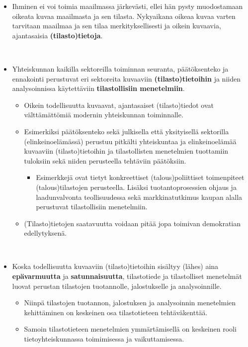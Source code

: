 \documentclass[
]{book}
\providecommand{\tightlist}{%
  \setlength{\itemsep}{0pt}\setlength{\parskip}{0pt}}
\begin{document}
\begin{itemize}
\tightlist
\item
  Ihminen ei voi toimia maailmassa järkevästi, ellei hän pysty muodostamaan oikeata kuvaa maailmasta ja sen tilasta. Nykyaikana oikeaa kuvaa varten tarvitaan maailmaa ja sen tilaa merkityksellisesti ja oikein kuvaavia, ajantasaisia \textbf{(tilasto)tietoja}.\\
  \strut \\
\item
  Yhteiskunnan kaikilla sektoreilla toiminnan seuranta, päätöksenteko ja ennakointi perustuvat eri sektoreita kuvaaviin \textbf{(tilasto)tietoihin} ja niiden analysoinnissa käytettäviin \textbf{tilastollisiin menetelmiin}.

  \begin{itemize}
  \tightlist
  \item
    Oikein todellisuutta kuvaavat, ajantasaiset (tilasto)tiedot ovat välttämättömiä modernin yhteiskunnan toiminnalle.
  \item
    Esimerkiksi päätöksenteko sekä julkisella että yksityisellä sektorilla (elinkeinoelämässä) perustuu pitkälti yhteiskuntaa ja elinkeinoelämää kuvaaviin (tilasto)tietoihin ja tilastollisten menetelmien tuottamiin tuloksiin sekä niiden perusteella tehtäviin päätöksiin.

    \begin{itemize}
    \tightlist
    \item
      Esimerkkejä ovat tietyt konkreettiset (talous)poliittiset toimenpiteet (talous)tilastojen perusteella. Lisäksi tuotantoprosessien ohjaus ja laadunvalvonta teollisuudessa sekä markkinatutkimus kaupan alalla perustuvat tilastollisiin menetelmiin.
    \end{itemize}
  \item
    (Tilasto)tietojen saatavuutta voidaan pitää jopa toimivan demokratian edellytyksenä.\\
    \strut \\
  \end{itemize}
\item
  Koska todellisuutta kuvaaviin (tilasto)tietoihin sisältyy (lähes) aina \textbf{epävarmuutta} ja \textbf{satunnaisuutta}, tilastotiede ja tilastolliset menetelmät luovat perustan tilastojen tuotannolle, jalostukselle ja analysoinnille.

  \begin{itemize}
  \tightlist
  \item
    Niinpä tilastojen tuotannon, jalostuksen ja analysoinnin menetelmien kehittäminen on keskeinen osa tilastotieteen tehtäväkenttää.
  \item
    Samoin tilastotieteen menetelmien ymmärtämisellä on keskeinen rooli tietoyhteiskunnassa toimimisessa ja vaikuttamisessa.\\
    \strut \\
  \end{itemize}
\end{itemize}
\end{document}
